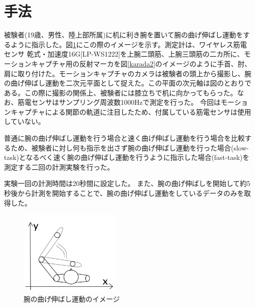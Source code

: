 \documentclass{jsarticle}
\begin{document}
\section{手法}
被験者(19歳、男性、陸上部所属)に机に利き腕を置いて腕の曲げ伸ばし運動をするように指示した。図\ref{karada1}にこの際のイメージを示す。測定計は、ワイヤレス筋電センサ 乾式・加速度16G[LP-WS1222]を上腕二頭筋、上腕三頭筋の二カ所に、モーションキャプチャ用の反射マーカを図\ref{karada2}のイメージのように手首、肘、肩に取り付けた。モーションキャプチャのカメラは被験者の頭上から撮影し、腕の曲げ伸ばし運動を二次元平面として捉えた。この平面の次元軸は図のとおりである。この際に撮影の関係上、被験者には膝立ちで机に向かってもらった。なお、筋電センサはサンプリング周波数1000Hzで測定を行った。
今回はモーションキャプチャによる関節の軌道に注目したため、付属している筋電センサは使用していない。

普通に腕の曲げ伸ばし運動を行う場合と速く曲げ伸ばし運動を行う場合を比較するため、被験者に対し何も指示を出さず腕の曲げ伸ばし運動を行った場合(slow-task)となるべく速く腕の曲げ伸ばし運動を行うように指示した場合(fast-task)を測定する二回の計測実験を行った。

実験一回の計測時間は20秒間に設定した。
また、腕の曲げ伸ばしを開始して約5秒後から計測を開始することで、腕の曲げ伸ばし運動をしているデータのみを取得した。

\begin{figure}[htb]
\begin{center}
\includegraphics[width=5cm]{karada1.png}
\caption{腕の曲げ伸ばし運動のイメージ}
\label{karada1}
\end{center}
\end{figure}

\end{document}
